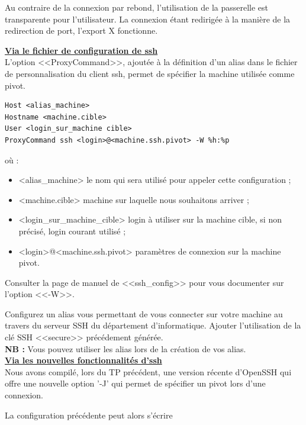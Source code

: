 \documentclass[11pt]{article}
\begin{document}
Au contraire de la connexion par rebond, l'utilisation de la passerelle est transparente pour l'utilisateur. La connexion étant redirigée à la manière de la redirection de port, l'export X fonctionne.

\noindent\textbf{\underline{Via le fichier de configuration de ssh}}\\

L'option <<ProxyCommand>>, ajoutée à la définition d'un alias dans le fichier de personnalisation du client ssh, permet de spécifier la machine utilisée comme pivot.

\begin{lstlisting}
Host <alias_machine>
Hostname <machine.cible>
User <login_sur_machine cible>
ProxyCommand ssh <login>@<machine.ssh.pivot> -W %h:%p
\end{lstlisting}

où :
\begin{itemize}
 \item{<alias\_machine>} le nom qui sera utilisé pour appeler cette configuration ;
 \item{<machine.cible>} machine sur laquelle nous souhaitons arriver ;
 \item{<login\_sur\_machine\_cible>} login à utiliser sur la machine cible, si non précisé, login courant utilisé ;
 \item{<login>@<machine.ssh.pivot>} paramètres de connexion sur la machine pivot.\\
\end{itemize}

Consulter la page de manuel de <<ssh\_config>> pour vous documenter sur l'option <<-W>>.

Configurez un alias vous permettant de vous connecter sur votre machine au travers du serveur SSH du département d'informatique. 
Ajouter l'utilisation de la clé SSH <<secure>> précédement générée.\\

\textbf{NB :} Vous pouvez utiliser les alias lors de la création de vos alias.\\

\noindent\textbf{\underline{Via les nouvelles fonctionnalités d'ssh}}\\

Nous avons compilé, lors du TP précédent, une version récente d'OpenSSH qui offre une nouvelle option '-J' qui permet de spécifier un pivot lors d'une connexion.

La configuration précédente peut alors s'écrire 
\end{document}
